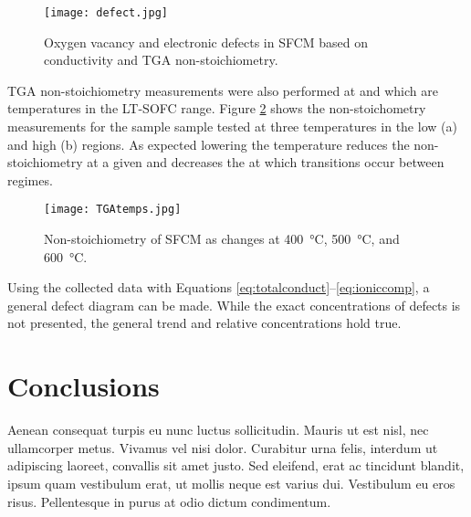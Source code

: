     \begin{figure}
      \texttt{[image: defect.jpg]}
      \caption{Oxygen vacancy and electronic defects in SFCM based on conductivity and TGA non-stoichiometry.}
      \label{fig:defects}
    \end{figure}

    TGA non-stoichiometry measurements were also performed at  and  which are temperatures in the LT-SOFC range.
    Figure \ref{fig:TGAtemps} shows the non-stoichometry measurements for the sample sample tested at three temperatures in the low  (a) and high  (b) regions.
    As expected lowering the temperature reduces the non-stoichiometry at a given  and decreases the  at which transitions occur between regimes.

    \begin{figure}
      \texttt{[image: TGAtemps.jpg]}
      \caption{Non-stoichiometry of SFCM as  changes at \SI{400}{\celsius}, \SI{500}{\celsius}, and \SI{600}{\celsius}.}
      \label{fig:TGAtemps}
    \end{figure}

    Using the collected data with Equations \ref{eq:totalconduct}{--}\ref{eq:ioniccomp}, a general defect diagram can be made.
    While the exact concentrations of defects is not presented, the general trend and relative concentrations hold true.


\section{Conclusions}
    Aenean consequat turpis eu nunc luctus sollicitudin. Mauris ut est nisl, nec ullamcorper metus. Vivamus vel nisi dolor. Curabitur urna felis, interdum ut adipiscing laoreet, convallis sit amet justo. Sed eleifend, erat ac tincidunt blandit, ipsum quam vestibulum erat, ut mollis neque est varius dui. Vestibulum eu eros risus. Pellentesque in purus at odio dictum condimentum.
